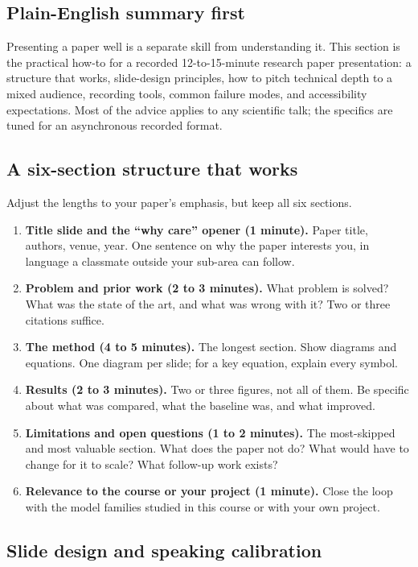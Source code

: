 \documentclass[11pt]{article}
\theoremstyle{remark}
\begin{document}
\subsection*{Plain-English summary first}

Presenting a paper well is a separate skill from understanding it. This section is the practical how-to for a recorded 12-to-15-minute research paper presentation: a structure that works, slide-design principles, how to pitch technical depth to a mixed audience, recording tools, common failure modes, and accessibility expectations. Most of the advice applies to any scientific talk; the specifics are tuned for an asynchronous recorded format.

\subsection{A six-section structure that works}

Adjust the lengths to your paper's emphasis, but keep all six sections.

\begin{enumerate}[leftmargin=1.6em]
  \item \textbf{Title slide and the ``why care'' opener (1 minute).} Paper title, authors, venue, year. One sentence on why the paper interests you, in language a classmate outside your sub-area can follow.
  \item \textbf{Problem and prior work (2 to 3 minutes).} What problem is solved? What was the state of the art, and what was wrong with it? Two or three citations suffice.
  \item \textbf{The method (4 to 5 minutes).} The longest section. Show diagrams and equations. One diagram per slide; for a key equation, explain every symbol.
  \item \textbf{Results (2 to 3 minutes).} Two or three figures, not all of them. Be specific about what was compared, what the baseline was, and what improved.
  \item \textbf{Limitations and open questions (1 to 2 minutes).} The most-skipped and most valuable section. What does the paper not do? What would have to change for it to scale? What follow-up work exists?
  \item \textbf{Relevance to the course or your project (1 minute).} Close the loop with the model families studied in this course or with your own project.
\end{enumerate}

\subsection{Slide design and speaking calibration}
\end{document}
